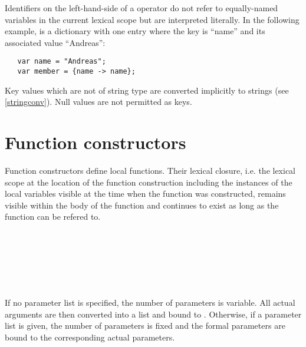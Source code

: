 \noindent
Identifiers on the left-hand-side of a \token{->} operator do not
refer to equally-named variables in the current lexical scope but are
interpreted literally. In the following example,  is a
dictionary with one entry where the key is ``name'' and its associated
value ``Andreas'':

\begin{lstlisting}
   var name = "Andreas";
   var member = {name -> name};
\end{lstlisting}

\noindent
Key values which are not of string type are converted implicitly
to strings (see \ref{stringconv}). Null values are not permitted
as keys.

\section{Function constructors}\label{funcon}

Function constructors define local functions.
Their lexical closure,
i.e. the lexical scope at the location of the function construction
including the instances of the local variables visible at the time
when the function was constructed, remains visible within
the body of the function and continues to exist as long as the function
can be refered to.

\begin{grammar}
      \produces {}  \\
      \produces {} 
	  \\
      \produces \lextoken{(} \lextoken{)} \\
      \produces \lextoken{(} 
	 \lextoken{)} \\
      \produces {} \\
      \produces {} \lextoken{,}
\end{grammar}

If no parameter list is specified, the number of parameters
is variable. All actual arguments are then converted into
a list and bound to . Otherwise, if a parameter
list is given, the number of parameters is fixed and the
formal parameters are bound to the corresponding actual
parameters.

